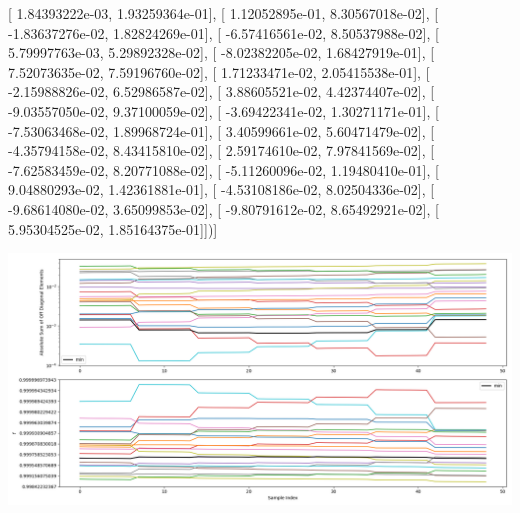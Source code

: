 \documentclass{article}
\begin{document}
       [  1.84393222e-03,   1.93259364e-01],
       [  1.12052895e-01,   8.30567018e-02],
       [ -1.83637276e-02,   1.82824269e-01],
       [ -6.57416561e-02,   8.50537988e-02],
       [  5.79997763e-03,   5.29892328e-02],
       [ -8.02382205e-02,   1.68427919e-01],
       [  7.52073635e-02,   7.59196760e-02],
       [  1.71233471e-02,   2.05415538e-01],
       [ -2.15988826e-02,   6.52986587e-02],
       [  3.88605521e-02,   4.42374407e-02],
       [ -9.03557050e-02,   9.37100059e-02],
       [ -3.69422341e-02,   1.30271171e-01],
       [ -7.53063468e-02,   1.89968724e-01],
       [  3.40599661e-02,   5.60471479e-02],
       [ -4.35794158e-02,   8.43415810e-02],
       [  2.59174610e-02,   7.97841569e-02],
       [ -7.62583459e-02,   8.20771088e-02],
       [ -5.11260096e-02,   1.19480410e-01],
       [  9.04880293e-02,   1.42361881e-01],
       [ -4.53108186e-02,   8.02504336e-02],
       [ -9.68614080e-02,   3.65099853e-02],
       [ -9.80791612e-02,   8.65492921e-02],
       [  5.95304525e-02,   1.85164375e-01]])]
\begin{center}
\includegraphics[scale=.9]{report_pickled_controls131/control_dpn_all.png}

\end{center}
\end{document}
